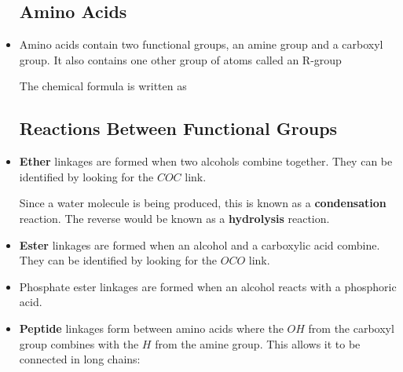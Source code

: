 \documentclass[letterpaper]{article}
\begin{document}
\begin{itemize}
    \subsection{Amino Acids}
    \item Amino acids contain two functional groups, an amine group and a carboxyl group. It also contains one other group of atoms called an R-group
    \begin{center}
    \end{center}
    The chemical formula is written as 
    \subsection{Reactions Between Functional Groups}
    \item \textbf{Ether} linkages are formed when two alcohols combine together. They can be identified by looking for the $COC$ link.
    \begin{center}
    \end{center}
    Since a water molecule is being produced, this is known as a \textbf{condensation} reaction. The reverse would be known as a \textbf{hydrolysis} reaction.
    \item \textbf{Ester} linkages are formed when an alcohol and a carboxylic acid combine. They can be identified by looking for the $OCO$ link.
    \begin{center}
    \end{center}
    \item Phosphate ester linkages are formed when an alcohol reacts with a phosphoric acid.
    \begin{center}
    \end{center}
    \item \textbf{Peptide} linkages form between amino acids where the $OH$ from the carboxyl group combines with the $H$ from the amine group. This allows it to be connected in long chains:
    \begin{center}
    \end{center}
    \end{itemize}
\newpage
\end{document}
